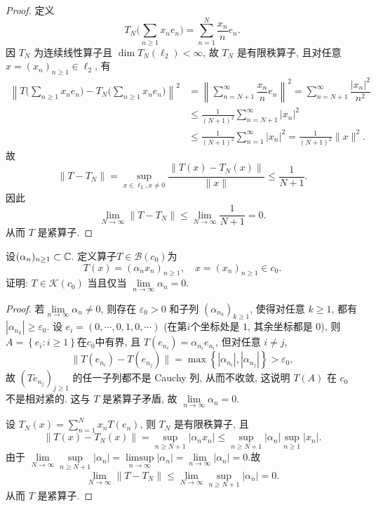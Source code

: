 \begin{proof}
    定义
    \[T_N\biggl(\sum_{n\geq 1}x_n e_n\biggr)=\sum_{n=1}^{N}\dfrac{x_n}{n}e_n.\]
    因 $T_N$ 为连续线性算子且 $\dim T_N(\ell_2)<\infty$, 故 $T_N$ 是有限秩算子, 
    且对任意 $x=(x_n)_{n\geq 1}\in\ell_2$, 有
    \[\begin{aligned}
        \left\|T\biggl(\sum_{n\geq 1}x_n e_n\biggr)-T_N \biggl(\sum_{n\geq 1}x_n e_n\biggr)\right\|_{}^2
        & =\left\|\sum_{n=N+1}^{\infty}\dfrac{x_n}{n}e_n\right\|^2=\sum_{n=N+1}^\infty \dfrac{|x_n|^2}{n^2}\\
        & \leq\frac{1}{(N+1)^2}\sum_{n=N+1}^\infty |x_n|^2\\
        & \leq\frac{1}{(N+1)^2}\sum_{n=1}^\infty |x_n|^2=\frac{1}{(N+1)^2}\|x\|_{}^2.
    \end{aligned}\]
    故
    \[\|T-T_N\|=\sup_{x\in\ell_2,x\neq 0}\frac{\|T(x)-T_N(x)\|_{}}{\|x\|_{}}\leq\frac{1}{N+1}.\]
    因此
    \[\lim_{N\rightarrow \infty}\|T-T_N\|\leq\lim_{N\to\infty}\frac{1}{N+1}=0.\] 
    从而 $T$ 是紧算子.
\end{proof}



\begin{exercise}
    设$(\alpha_n)_{n\geq 1}\subset\mathbb{C}$. 定义算子$T\in \mathcal{B}(c_0)$为
    \[T(x)=(\alpha_n x_n)_{n\geq1},\quad x=(x_n)_{n\geq 1}\in c_0.\]
    证明: $T\in \mathcal{K}(c_0)$ 当且仅当 $\lim\limits_{n\rightarrow \infty}\alpha_n=0$.
\end{exercise}

\begin{proof}
    \necessary
    若$\lim\limits_{n\rightarrow \infty} \alpha_n\not=0$, 
    则存在 $\varepsilon_0>0$ 和子列 $(\alpha_{n_k})_{k\geq 1}$, 
    使得对任意 $k\geq 1$, 都有 $|\alpha_{n_k}|\geq\varepsilon_0$. 
    设 $e_i=(0,\cdots,0,1,0,\cdots)$ (在第$i$个坐标处是 $1$, 其余坐标都是 $0$),  
    则 $A=\left\{e_i\colon i\geq 1\right\}$在$c_0$中有界, 且 $T(e_{n_i})=\alpha_{n_i}e_{n_i}$,
    但对任意 $i\neq j$, 
    \[\|T(e_{n_i})-T(e_{n_j})\|=\max\left\{|\alpha_{n_i}|,|\alpha_{n_j}|\right\}>\varepsilon_0,\]
    故 $(Te_{n_j})_{j\geq1}$ 的任一子列都不是 Cauchy 列, 从而不收敛, 
    这说明 $T(A)$ 在 $c_0$ 不是相对紧的. 这与 $T$ 是紧算子矛盾, 故 $\lim\limits_{n\rightarrow \infty}\alpha_n=0$.

    \sufficient
    设 $T_N(x)=\sum_{n=1}^N x_n T(e_n)$, 则 $T_N$ 是有限秩算子, 且
    \[\|T(x)-T_N(x)\|=\sup_{n\geq N+1}|\alpha_n x_n|\leq \sup_{n\geq N+1}|\alpha_n| \sup_{n\geq 1}|x_n|.\]
    由于 $\lim\limits_{N\rightarrow \infty} \sup\limits_{n\geq N+1}|\alpha_n|=\limsup\limits_{n\rightarrow \infty}|\alpha_n|=\lim\limits_{n\rightarrow \infty}|\alpha_n|=0$.故
    \[\lim\limits_{N\rightarrow \infty}\|T-T_N\|\leq  \lim\limits_{N\rightarrow \infty}\sup_{n\geq N+1}|\alpha_n|=0.\]
    从而 $T$ 是紧算子.
\end{proof}



